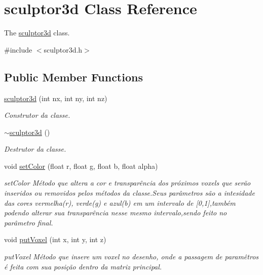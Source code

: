 \hypertarget{classsculptor3d}{}\section{sculptor3d Class Reference}
\label{classsculptor3d}


The \mbox{\hyperlink{classsculptor3d}{sculptor3d}} class.  




{\ttfamily \#include $<$sculptor3d.\+h$>$}

\subsection*{Public Member Functions}
\begin{DoxyCompactItemize}
\item 
\mbox{\hyperlink{classsculptor3d_a36be08ef50a69161c1332f4a1cff226c}{sculptor3d}} (int nx, int ny, int nz)
\begin{DoxyCompactList}\small\item\em Construtor da classe. \end{DoxyCompactList}\item 
\mbox{\label{classsculptor3d_ac0aa5ebfa033c54aad6a8d995ecbede8}} 
\mbox{\hyperlink{classsculptor3d_ac0aa5ebfa033c54aad6a8d995ecbede8}{$\sim$sculptor3d}} ()
\begin{DoxyCompactList}\small\item\em Destrutor da classe. \end{DoxyCompactList}\item 
void \mbox{\hyperlink{classsculptor3d_aba9db4181e1087a09f1de6eee3d03705}{set\+Color}} (float r, float g, float b, float alpha)
\begin{DoxyCompactList}\small\item\em set\+Color Método que altera a cor e transparência dos próximos voxels que serão inseridos ou removidos pelos métodos da classe.\+Seus parâmetros são a intesidade das cores vermelha(r), verde(g) e azul(b) em um intervalo de \mbox{[}0,1\mbox{]},também podendo alterar sua transparência nesse mesmo intervalo,sendo feito no parâmetro final. \end{DoxyCompactList}\item 
void \mbox{\hyperlink{classsculptor3d_a15cb3ad622cf1b85f3c5811af1fe1ff3}{put\+Voxel}} (int x, int y, int z)
\begin{DoxyCompactList}\small\item\em put\+Voxel Método que insere um voxel no desenho, onde a passagem de paramêtros é feita com sua posição dentro da matriz principal. \end{DoxyCompactList}\item 

\end{DoxyCompactItemize}
